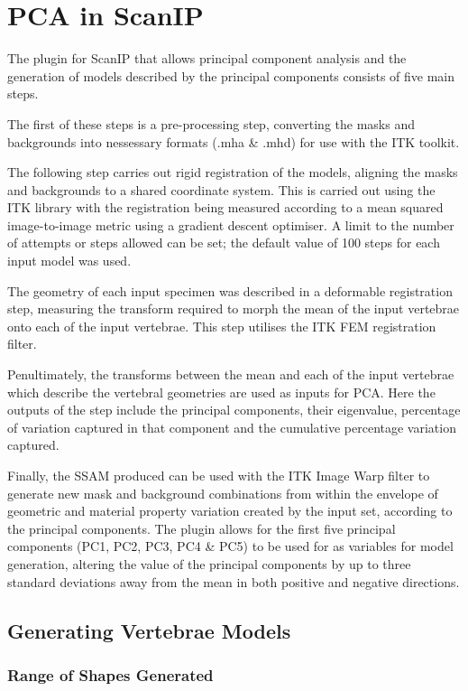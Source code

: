 \section{PCA in ScanIP}

The plugin for ScanIP that allows principal component analysis and the generation of models described by the principal components consists of five main steps.

The first of these steps is a pre-processing step, converting the masks and backgrounds into nessessary formats (.mha \& .mhd) for use with the ITK toolkit.

The following step carries out rigid registration of the models, aligning the masks and backgrounds to a shared coordinate system.
This is carried out using the ITK library with the registration being measured according to a mean squared image-to-image metric using a gradient descent optimiser.
A limit to the number of attempts or steps allowed can be set; the default value of 100 steps for each input model was used.

The geometry of each input specimen was described in a deformable registration step, measuring the transform required to morph the mean of the input vertebrae onto each of the input vertebrae.
This step utilises the ITK FEM registration filter.

Penultimately, the transforms between the mean and each of the input vertebrae which describe the vertebral geometries are used as inputs for PCA.
Here the outputs of the step include the principal components, their eigenvalue, percentage of variation captured in that component and the cumulative percentage variation captured.

Finally, the SSAM produced can be used with the ITK Image Warp filter to generate new mask and background combinations from within the envelope of geometric and material property variation created by the input set, according to the principal components.
The plugin allows for the first five principal components (PC1, PC2, PC3, PC4 \& PC5) to be used for as variables for model generation, altering the value of the principal components by up to three standard deviations away from the mean in both positive and negative directions.

\subsection{Generating Vertebrae Models}

\subsubsection{Range of Shapes Generated}


